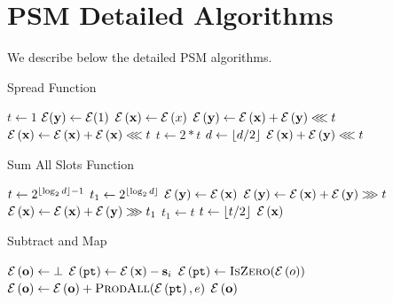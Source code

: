 \section{PSM Detailed Algorithms}\label{app:psmalgorithms}
We describe below the detailed PSM algorithms.

\begin{algorithm}[ht]
\caption{Spread Function}\label{alg:spread}
\small
\begin{algorithmic}
    \State $t \gets 1$
    \State $\mathcal{E}(\mathbf{y}) \gets \mathcal{E}(1)$
    \State $\mathcal{E}\left({\mathbf{x}}\right) \gets \mathcal{E}\left({x}\right)$
            \State $\mathcal{E}\left({\mathbf{y}}\right) \gets \mathcal{E}\left({\mathbf{x}}\right) + \mathcal{E}\left({\mathbf{y}}\right) \lll t$
        \EndIf
        \State $\mathcal{E}\left({\mathbf{x}}\right) \gets \mathcal{E}\left({\mathbf{x}}\right) + \mathcal{E}\left({\mathbf{x}}\right) \lll t$
        \State $t \gets 2*t$
        \State $d \gets \left\lfloor d/2 \right\rfloor$
    \EndWhile
    \State \Return $\mathcal{E}\left({\mathbf{x}}\right) + \mathcal{E}\left({\mathbf{y}}\right) \lll t$
\EndFunction
\end{algorithmic}
\end{algorithm}

\begin{algorithm}[ht]
\caption{Sum All Slots Function}\label{alg:sumall}
\small
\begin{algorithmic}
    \State $t \gets 2^{\left\lfloor \log_2{d} \right\rfloor-1}$
    \State $t_1 \gets 2^{\left\lfloor \log_2{d} \right\rfloor}$
    \State $\mathcal{E}\left({\mathbf{y}}\right) \gets \mathcal{E}\left({\mathbf{x}}\right)$
        \State $\mathcal{E}\left({\mathbf{y}}\right) \gets \mathcal{E}\left({\mathbf{x}}\right) + \mathcal{E}\left({\mathbf{y}}\right) \ggg t$
            \State $\mathcal{E}\left({\mathbf{x}}\right) \gets \mathcal{E}\left({\mathbf{x}}\right) + \mathcal{E}\left({\mathbf{y}}\right) \ggg t_1$
            \State $t_1 \gets t$
        \EndIf
        \State $t \gets \left\lfloor t/2 \right\rfloor$
    \EndWhile
    \State \Return $\mathcal{E}\left({\mathbf{x}}\right)$
\EndFunction
\end{algorithmic}
\end{algorithm}

\begin{algorithm}[ht]
\caption{Subtract and Map}\label{alg:subadd}
\small
\begin{algorithmic}
    \State $\mathcal{E}\left({\mathbf{o}}\right) \gets \bot$
        \State $\mathcal{E}\left({{\mathtt{pt}}}\right) \gets \mathcal{E}\left({\mathbf{x}}\right)-\mathbf{s}_i$
        \State $\enc{\pt} \gets \Call{IsZero}{\enc{o}}$
        \State $\enc{\po} \gets \enc{\po} + \Call{ProdAll}{\enc{\pt},e}$
    \EndFor
    \State \Return $\mathcal{E}\left({\mathbf{o}}\right)$
\EndFunction
\end{algorithmic}
\end{algorithm}

